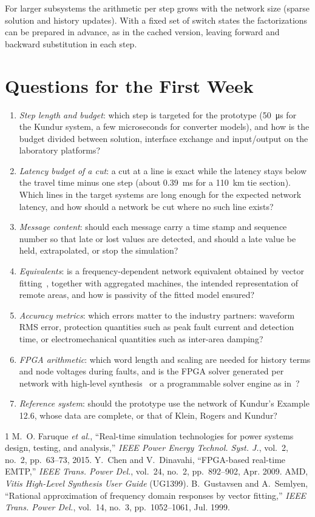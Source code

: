 \documentclass[conference]{IEEEtran}
\begin{document}
For larger subsystems the arithmetic per step grows with the network size (sparse solution and history updates). With a fixed set of switch states the factorizations can be prepared in advance, as in the cached version, leaving forward and backward substitution in each step.

\section{Questions for the First Week}
\begin{enumerate}
\item \emph{Step length and budget}: which step is targeted for the prototype (\SI{50}{\micro\second} for the Kundur system, a few microseconds for converter models), and how is the budget divided between solution, interface exchange and input/output on the laboratory platforms?
\item \emph{Latency budget of a cut}: a cut at a line is exact while the latency stays below the travel time minus one step (about \SI{0.39}{ms} for a \SI{110}{km} tie section). Which lines in the target systems are long enough for the expected network latency, and how should a network be cut where no such line exists?
\item \emph{Message content}: should each message carry a time stamp and sequence number so that late or lost values are detected, and should a late value be held, extrapolated, or stop the simulation?
\item \emph{Equivalents}: is a frequency-dependent network equivalent obtained by vector fitting~\cite{vf}, together with aggregated machines, the intended representation of remote areas, and how is passivity of the fitted model ensured?
\item \emph{Accuracy metrics}: which errors matter to the industry partners: waveform RMS error, protection quantities such as peak fault current and detection time, or electromechanical quantities such as inter-area damping?
\item \emph{FPGA arithmetic}: which word length and scaling are needed for history terms and node voltages during faults, and is the FPGA solver generated per network with high-level synthesis~\cite{hls} or a programmable solver engine as in~\cite{chen}?
\item \emph{Reference system}: should the prototype use the network of Kundur's Example 12.6, whose data are complete, or that of Klein, Rogers and Kundur?
\end{enumerate}

\begin{thebibliography}{1}
 M.~O. Faruque \emph{et al.}, ``Real-time simulation technologies for power systems design, testing, and analysis,'' \emph{IEEE Power Energy Technol. Syst. J.}, vol.~2, no.~2, pp.~63--73, 2015.
 Y.~Chen and V.~Dinavahi, ``FPGA-based real-time EMTP,'' \emph{IEEE Trans. Power Del.}, vol.~24, no.~2, pp.~892--902, Apr. 2009.
 AMD, \emph{Vitis High-Level Synthesis User Guide} (UG1399).
 B.~Gustavsen and A.~Semlyen, ``Rational approximation of frequency domain responses by vector fitting,'' \emph{IEEE Trans. Power Del.}, vol.~14, no.~3, pp.~1052--1061, Jul. 1999.
\end{thebibliography}
\end{document}
